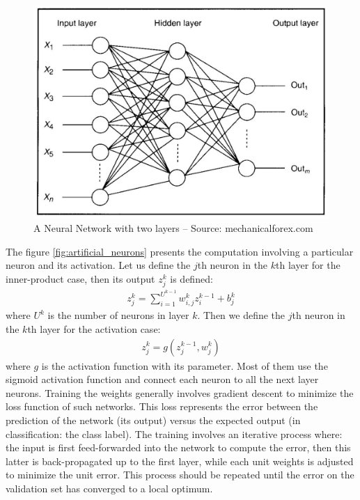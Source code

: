 \documentclass[a4paper,12pt]{report}
\begin{document}
\begin{figure}[t]
    \begin{center}
        \includegraphics{thesis_figures/NN.jpg}
    \end{center}
    \caption{A Neural Network with two layers -- Source: mechanicalforex.com}
    \label{fig:neural_network}
\end{figure}

The figure \ref{fig:artificial_neurons} presents the computation involving a particular neuron and its activation.
Let us define the $j$th neuron in the $k$th layer for the inner-product case, then its output $z^k_j$ is defined:
\begin{eqnarray}
    z^k_j = \sum_{i=1}^{U^{k-1}} w^k_{i,j} z^{k-1}_i + b^k_j
\end{eqnarray}
where $U^k$ is the number of neurons in layer $k$.
Then we define the $j$th neuron in the $k$th layer for the activation case:
\begin{eqnarray}
    z^k_j = g(z^{k-1}_j, w^k_{j})
\end{eqnarray}
where $g$ is the activation function with its parameter.
Most of them use the sigmoid activation function and connect each neuron to all the next layer neurons.
Training the weights generally involves gradient descent to minimize the loss function of such networks.
This loss represents the error between the prediction of the network (its output) versus the expected output (in classification: the class label).
The training involves an iterative process where: the input is first feed-forwarded into the network to compute the error, then this latter is back-propagated up to the first layer, while each unit weights is adjusted to minimize the unit error.
This process should be repeated until the error on the validation set has converged to a local optimum.
\end{document}
